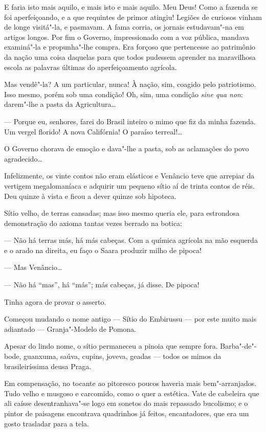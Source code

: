 E faria isto mais aquilo, e mais isto e mais aquilo. Meu Deus! Como a
fazenda se foi aperfeiçoando, e a que requintes de primor atingiu!
Legiões de curiosos vinham de longe visitá"-la, e pasmavam. A fama
corria, os jornais estudavam"-na em artigos longos. Por fim o Governo,
impressionado com a voz pública, mandava examiná"-la e propunha"-lhe
compra. Era forçoso que pertencesse ao patrimônio da nação uma coisa
daquelas para que todos pudessem aprender na maravilhosa escola as
palavras últimas do aperfeiçoamento agrícola.

Mas vendê"-la? A um particular, nunca! À nação, sim, coagido pelo
patriotismo. Isso mesmo, porém sob uma condição! Oh, sim, uma condição
\emph{sine qua non}: darem"-lhe a pasta da Agricultura\ldots{}

--- Porque eu, senhores, farei do Brasil inteiro o mimo que fiz da minha
fazenda. Um vergel florido! A nova Califórnia! O paraíso terreal!\ldots{}

O Governo chorava de emoção e dava"-lhe a pasta, sob as aclamações do
povo agradecido\ldots{}

Infelizmente, os vinte contos não eram elásticos e Venâncio teve que
arrepiar da vertigem megalomaníaca e adquirir um pequeno sítio aí de
trinta contos de réis. Deu quinze à vista e ficou a dever quinze sob
hipoteca.

Sítio velho, de terras cansadas; mas isso mesmo queria ele, para
estrondosa demonstração do axioma tantas vezes berrado na botica:

--- Não há terras más, há más cabeças. Com a química agrícola na mão
esquerda e o arado na direita, eu faço o Saara produzir milho de pipoca!

--- Mas Venâncio\ldots{}

--- Não há ``mas'', há ``más''; más cabeças, já disse. De pipoca!

Tinha agora de provar o asserto.

Começou mudando o nome antigo --- Sítio do Embirussu --- por este muito
mais adiantado --- Granja"-Modelo de Pomona.

Apesar do lindo nome, o sítio permaneceu a pinoia que sempre fora.
Barba"-de"-bode, guanxuma, saúva, cupins, joveva, geadas --- todos os
mimos da brasileiríssima deusa Praga.

Em compensação, no tocante ao pitoresco poucos haveria mais
bem"-arranjados. Tudo velho e musgoso e carcomido, como o quer a
estética. Vate de cabeleira que ali caísse desentranhava"-se logo em
sonetos do mais repassado bucolismo; e o pintor de paisagens encontrava
quadrinhos já feitos, encantadores, que era um gosto trasladar para a
tela.

